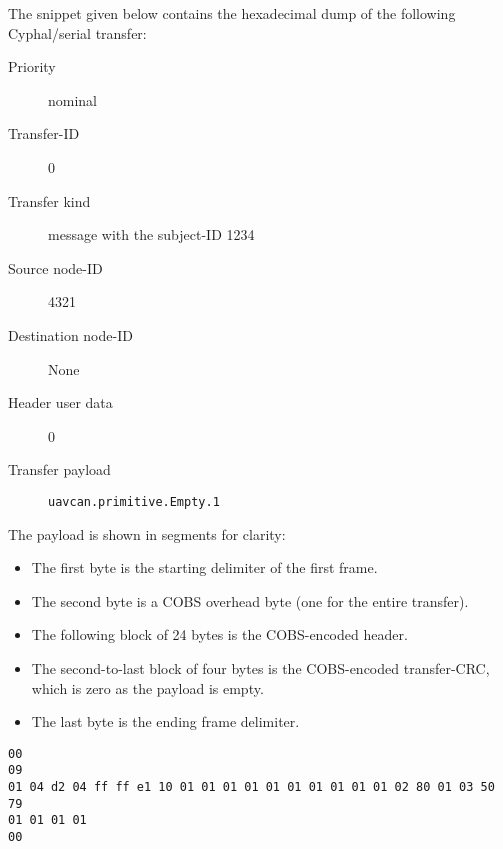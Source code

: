 \begin{remark}
    The snippet given below contains the hexadecimal dump of the following Cyphal/serial transfer:

    \begin{description}
        \item[Priority] nominal
        \item[Transfer-ID] 0
        \item[Transfer kind] message with the subject-ID 1234
        \item[Source node-ID] 4321
        \item[Destination node-ID] None
        \item[Header user data] 0
        \item[Transfer payload] \verb|uavcan.primitive.Empty.1|
    \end{description}

    The payload is shown in segments for clarity:

    \begin{itemize}
        \item The first byte is the starting delimiter of the first frame.
        \item The second byte is a COBS overhead byte (one for the entire transfer).
        \item The following block of 24 bytes is the COBS-encoded header.
        \item The second-to-last block of four bytes is the COBS-encoded transfer-CRC,
        which is zero as the payload is empty.
        \item The last byte is the ending frame delimiter.
    \end{itemize}

    \begin{verbatim}
00
09
01 04 d2 04 ff ff e1 10 01 01 01 01 01 01 01 01 01 01 02 80 01 03 50 79
01 01 01 01
00
    \end{verbatim}
\end{remark}
